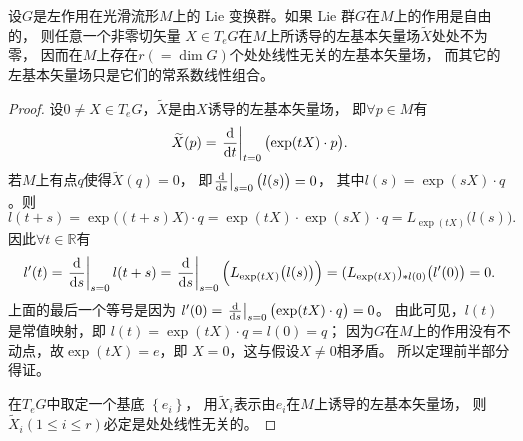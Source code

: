 \begin{theorem}
    设$G$是左作用在光滑流形$M$上的 Lie 变换群。如果 Lie 群$G$在$M$上的作用是自由的，
    则任意一个非零切矢量 $X \in T_e G$在$M$上所诱导的左基本矢量场$\widetilde{X}$处处不为零，
    因而在$M$上存在$r(=\dim  G)$个处处线性无关的左基本矢量场，
    而其它的左基本矢量场只是它们的常系数线性组合。
\end{theorem}
\begin{proof}
    设$0 \neq X \in T_e G$，$\widetilde{X}$是由$X$诱导的左基本矢量场，
    即$\forall p \in M$有
    \begin{equation}
        \widetilde{X}(p)=\left.\frac{\dd }{\dd t}\right|_{t=0}\bigl(\exp (t X)\cdot p\bigr) .
    \end{equation}
    若$M$上有点$q$使得$\widetilde{X}(q)=0$，
    即$\left.\frac{\dd }{\dd s}\right|_{s=0}\bigl(l(s) \bigr)=0$，
    其中$l(s)=\exp (s X)\cdot q$。则
    \begin{equation*}
        l(t+s)=\exp \bigl((t+s) X\bigr)\cdot q
        =\exp (t X) \cdot \exp (s X) \cdot q =L_{\exp (t X)}\bigl(l(s)\bigr) .
    \end{equation*}
    因此$\forall t \in \mathbb{R}$有
    \begin{equation*}
        l^{\prime}(t) =\left.\frac{\dd }{\dd s}\right|_{s=0} l(t+s)
        =\left.\frac{\dd }{\dd s}\right|_{s=0}\Bigl(L_{\exp (t X)}\bigl(l(s)\bigr)\Bigr)
        =(L_{\exp (t X)})_{* l(0)}\bigl(l^{\prime}(0)\bigr)=0 .
    \end{equation*}
    上面的最后一个等号是因为
    $l^{\prime}(0)=\left.\frac{\dd }{\dd s}\right|_{s=0}\bigl(\exp (t X)\cdot q\bigr)=0$。
    由此可见，$l(t)$是常值映射，即
    $l(t)=\exp (t X)\cdot q=l(0)=q $；
    因为$G$在$M$上的作用没有不动点，故$\exp (t X)=e$，即 $X=0$，这与假设$X \neq 0$相矛盾。
    所以定理前半部分得证。

    在$T_e G$中取定一个基底 $\left\{e_i\right\}$，
    用$\widetilde{X}_i$表示由$e_i$在$M$上诱导的左基本矢量场，
    则$\widetilde{X}_i (1 \leqslant i \leqslant r)$必定是处处线性无关的。
\end{proof}

